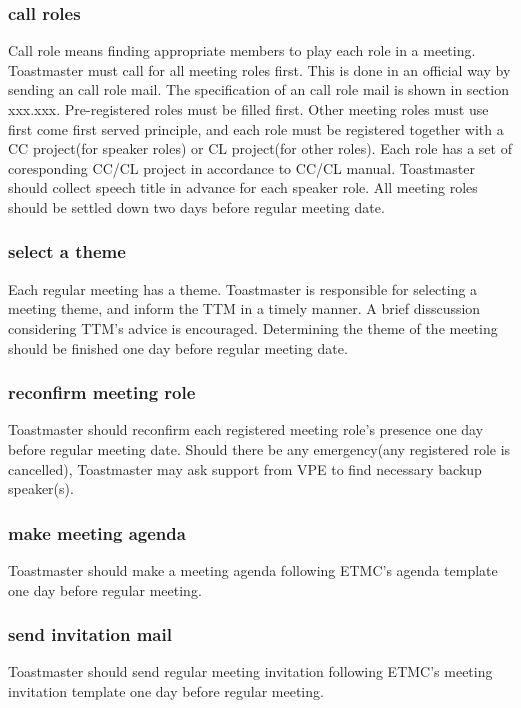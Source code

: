\subsubsection{call roles}

Call role means finding appropriate members to play each role in a meeting. 
Toastmaster must call for all meeting roles first. This is done in an official
way by sending an call role mail. The specification of an call role mail is shown
in section xxx.xxx. Pre-registered roles must be filled first. Other meeting roles
must use first come first served principle, and each role must be registered together
with a CC project(for speaker roles) or CL project(for other roles). Each role has 
a set of coresponding CC/CL project in accordance to CC/CL manual. Toastmaster 
should collect speech title in advance for each speaker role. All meeting roles
should be settled down two days before regular meeting date. 

\subsubsection{select a theme}
Each regular meeting has a theme. Toastmaster is responsible for selecting a meeting
theme, and inform the TTM in a timely manner. A brief disscussion considering TTM's 
advice is encouraged. Determining the theme of the meeting should be finished one day 
before regular meeting date.

\subsubsection{reconfirm meeting role}
Toastmaster should reconfirm each registered meeting role's presence one day before 
regular meeting date. Should there be any emergency(any registered role is cancelled),
Toastmaster may ask support from VPE to find necessary backup speaker(s).

\subsubsection{make meeting agenda}
Toastmaster should make a meeting agenda following ETMC's agenda template one day before 
regular meeting.

\subsubsection{send invitation mail}
Toastmaster should send regular meeting invitation following ETMC's meeting invitation 
template one day before regular meeting.

